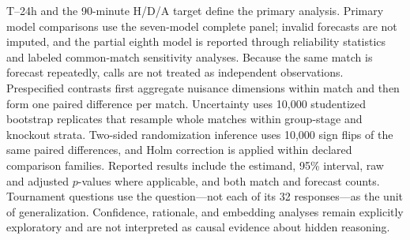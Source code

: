 T--24h and the 90-minute H/D/A target define the primary analysis. Primary model comparisons use the
seven-model complete panel; invalid forecasts are not imputed, and the partial eighth model is
reported through reliability statistics and labeled common-match sensitivity analyses. Because the
same match is forecast repeatedly, calls are not treated as independent observations. Prespecified
contrasts first aggregate nuisance dimensions within match and then form one paired difference per
match. Uncertainty uses 10,000 studentized bootstrap replicates that resample whole matches within
group-stage and knockout strata. Two-sided randomization inference uses 10,000 sign flips of the same
paired differences, and Holm correction is applied within declared comparison families. Reported
results include the estimand, 95\% interval, raw and adjusted $p$-values where applicable, and both
match and forecast counts. Tournament questions use the question---not each of its 32 responses---as
the unit of generalization. Confidence, rationale, and embedding analyses remain explicitly
exploratory and are not interpreted as causal evidence about hidden reasoning.
